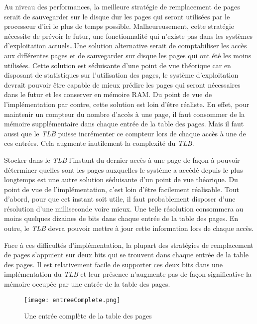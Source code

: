 Au niveau des performances, la meilleure stratégie de remplacement de
pages serait de sauvegarder sur le disque dur les pages qui seront
utilisées par le processeur d'ici le plus de temps possible.
Malheureusement, cette stratégie nécessite de prévoir le futur, une
fonctionnalité qui n'existe pas dans les systèmes d'exploitation
actuels\ldots Une solution alternative serait de comptabiliser les accès
aux différentes pages et de sauvegarder sur disque les pages qui ont été
les moins utilisées. Cette solution est séduisante d'une point de vue
théorique car en disposant de statistiques sur l'utilisation des pages,
le système d'exploitation devrait pouvoir être capable de mieux prédire
les pages qui seront nécessaires dans le futur et les conserver en
mémoire RAM. Du point de vue de l'implémentation par contre, cette
solution est loin d'être réaliste. En effet, pour maintenir un compteur
du nombre d'accès à une page, il faut consommer de la mémoire
supplémentaire dans chaque entrée de la table des pages. Mais il faut
aussi que le \textit{TLB} puisse incrémenter ce compteur lors de chaque
accès à une de ces entrées. Cela augmente inutilement la complexité du
\textit{TLB}.\newline
   
Stocker dans le \textit{TLB} l'instant du dernier accès à une page de
façon à pouvoir déterminer quelles sont les pages auxquelles le système
a accédé depuis le plus longtemps est une autre solution séduisante d'un
point de vue théorique. Du point de vue de l'implémentation, c'est loin
d'être facilement réalisable. Tout d'abord, pour que cet instant soit
utile, il faut probablement disposer d'une résolution d'une milliseconde
voire mieux. Une telle résolution consommera au moins quelques dizaines
de bits dans chaque entrée de la table des pages. En outre, le
\textit{TLB} devra pouvoir mettre à jour cette information lors de
chaque accès.\newline

Face à ces difficultés d'implémentation, la plupart des stratégies de
remplacement de pages s'appuient sur deux bits qui se trouvent dans
chaque entrée de la table des pages. Il est relativement facile de
supporter ces deux bits dans une implémentation du \textit{TLB} et leur
présence n'augmente pas de façon significative la mémoire occupée par
une entrée de la table des pages.\newline
   
\begin{figure}[!ht]
    \centering
    \texttt{[image: entreeComplete.png]}
    \caption{Une entrée complète de la table des pages}
\end{figure}

